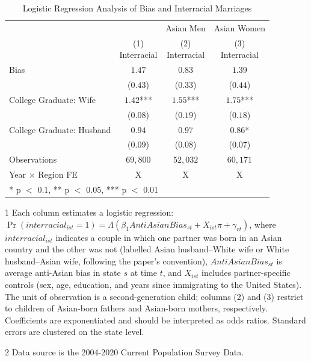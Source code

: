 \begin{table}[H]
\centering\centering
\caption{Logistic Regression Analysis of Bias and Interracial Marriages \label{regtab-logit-03}}
\centering
\begin{threeparttable}
\begin{tabular}[t]{lccc}
\toprule
\multicolumn{2}{c}{ } & \multicolumn{1}{c}{Asian Men} & \multicolumn{1}{c}{Asian Women} \\
\cmidrule(l{3pt}r{3pt}){3-3} \cmidrule(l{3pt}r{3pt}){4-4}
  & \specialcell{(1) \\ Interracial} & \specialcell{(2) \\ Interracial} & \specialcell{(3) \\ Interracial}\\
\midrule
Bias & $1.47$ & $0.83$ & $1.39$\\
 & ($0.43$) & ($0.33$) & ($0.44$)\\
College Graduate: Wife & $1.42$*** & $1.55$*** & $1.75$***\\
 & ($0.08$) & ($0.19$) & ($0.18$)\\
College Graduate: Husband & $0.94$ & $0.97$ & $0.86$*\\
 & ($0.09$) & ($0.08$) & ($0.07$)\\
\midrule
Observations & $69,800$ & $52,032$ & $60,171$\\
Year $\times$ Region FE & X & X & X\\
\bottomrule
\multicolumn{4}{l}{\rule{0pt}{1em}* p $<$ 0.1, ** p $<$ 0.05, *** p $<$ 0.01}\\
\end{tabular}
\begin{tablenotes}
\small
\item[1] \footnotesize{Each column estimates a logistic regression: $\Pr(interracial_{ist} = 1) = \Lambda(\beta_1 AntiAsianBias_{st} + X_{ist}\pi + \gamma_{rt})$, where $interracial_{ist}$ indicates a couple in which one partner was born in an Asian country and the other was not (labelled Asian husband--White wife or White husband--Asian wife, following the paper's convention), $AntiAsianBias_{st}$ is average anti-Asian bias in state $s$ at time $t$, and $X_{ist}$ includes partner-specific controls (sex, age, education, and years since immigrating to the United States). The unit of observation is a second-generation child; columns (2) and (3) restrict to children of Asian-born fathers and Asian-born mothers, respectively. Coefficients are exponentiated and should be interpreted as odds ratios. Standard errors are clustered on the state level.}
\item[2] \footnotesize{Data source is the 2004-2020 Current Population Survey Data.}
\end{tablenotes}
\end{threeparttable}
\end{table}
